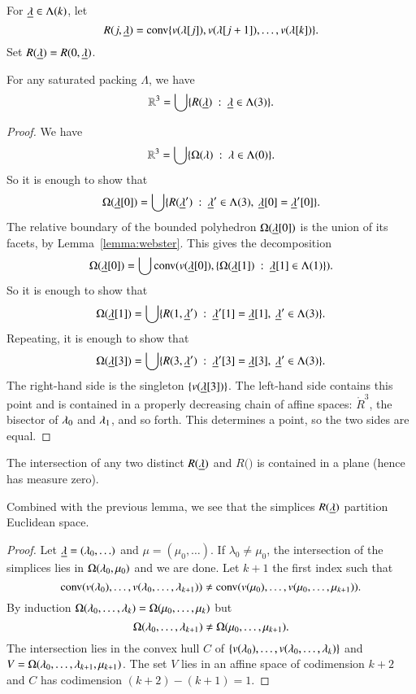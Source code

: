 For ${\underline{\lambda}}\in\Lambda(k)$, let 
$$R(j,{\underline{\lambda}}) = {\operatorname{conv}}\{v(\lambda[j]), v(\lambda[j+1]),\ldots,v(\lambda[k])\}.$$  Set $R({\underline{\lambda}})=R(0,{\underline{\lambda}})$.


\begin{lemma}
For any saturated packing $\Lambda$, we have
$$\mathbb{R}^3 = \bigcup \{ R({\underline{\lambda}}) \ :\  {\underline{\lambda}}\in \Lambda(3)\}.$$
\end{lemma}

\begin{proof}
We have $$\mathbb{R}^3 = \bigcup \{\Omega(\lambda)\ :\  \lambda\in \Lambda(0)\}.$$
So it is enough to show that
$$\Omega({\underline{\lambda}}[0]) = \bigcup \{ R({\underline{\lambda}}') \ :\  {\underline{\lambda}}'\in \Lambda(3),~{\underline{\lambda}}[0]={\underline{\lambda}}'[0]\}.$$
The relative boundary of the bounded polyhedron $\Omega({\underline{\lambda}}[0])$ is the union of its facets, by Lemma~\ref{lemma:webster}.  This gives the decomposition
$$\Omega({\underline{\lambda}}[0]) = \bigcup {\operatorname{conv}}(v({\underline{\lambda}}[0]),\{\Omega({\underline{\lambda}}[1])\ :\  {\underline{\lambda}}[1]\in \Lambda(1)\}).$$
So it is enough to show that
$$\Omega({\underline{\lambda}}[1]) = \bigcup \{ R(1,{\underline{\lambda}}') \ :\  {\underline{\lambda}}'[1]={\underline{\lambda}}[1],~{\underline{\lambda}}'\in \Lambda(3)\}.$$
Repeating, it is enough to show that
$$\Omega({\underline{\lambda}}[3]) = \bigcup\{R(3,{\underline{\lambda}}')\ :\ {\underline{\lambda}}'[3]={\underline{\lambda}}[3],~{\underline{\lambda}}'\in\Lambda(3)\}.$$
The right-hand side is the singleton $\{v({\underline{\lambda}}[3])\}$.  The left-hand side
contains this point and is contained in a properly decreasing chain of affine spaces:
$\ring{R}^3$, the bisector of $\lambda_0$ and $\lambda_1$, and so forth.  This determines a point,
so the two sides are equal.
\end{proof}

\begin{lemma}  
The intersection of any two distinct $R({\underline{\lambda}})$ and $R(\bm)$ is contained in a plane (hence has measure zero).
\end{lemma}

Combined with the previous lemma, we see that the simplices $R({\underline{\lambda}})$ partition Euclidean
space.

\begin{proof}  Let ${\underline{\lambda}} = (\lambda_0,\ldots)$ and $\mu = (\mu_0,\ldots)$.
If $\lambda_0\ne\mu_0$, the intersection of the simplices lies in $\Omega(\lambda_0,\mu_0)$
and we are done.  Let $k+1$ the first index such that
$${\operatorname{conv}}(v(\lambda_0),\ldots,v(\lambda_0,\ldots,\lambda_{k+1}))\ne
{\operatorname{conv}}(v(\mu_0),\ldots,v(\mu_0,\ldots,\mu_{k+1})).
$$
By induction $\Omega(\lambda_0,\ldots,\lambda_k) = \Omega(\mu_0,\ldots,\mu_k)$
but
$$\Omega(\lambda_0,\ldots,\lambda_{k+1}) \ne \Omega(\mu_0,\ldots,\mu_{k+1}).$$
The intersection lies in the convex hull $C$ of
$\{v(\lambda_0),\ldots,v(\lambda_0,\ldots,\lambda_k)\}$ and
$V=\Omega(\lambda_0,\ldots,\lambda_{k+1},\mu_{k+1})$.  The set $V$ lies in an affine space of 
codimension $k+2$
and $C$ has codimension $(k+2) - (k+1) = 1$.
\end{proof}

